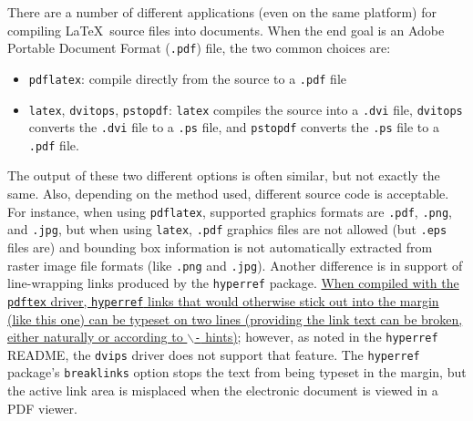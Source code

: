 There are a number of different applications (even on the same platform) for compiling \LaTeX\ source files into documents.
When the end goal is an Adobe Portable Document Format (\texttt{.pdf}) file, the two common choices are:
\begin{itemize}%
\item \texttt{pdflatex}: compile directly from the source to a \texttt{.pdf} file
\item \texttt{latex}, \texttt{dvitops}, \texttt{pstopdf}: \texttt{latex} compiles the source into a \texttt{.dvi} file, \texttt{dvi\-tops} converts the \texttt{.dvi} file to a \texttt{.ps} file, and \texttt{pstopdf} converts the \texttt{.ps} file to a \texttt{.pdf} file.
\end{itemize}%
The output of these two different options is often similar, but not exactly the same.
Also, depending on the method used, different source code is acceptable.
For instance, when using \texttt{pdflatex}, supported graphics formats are \texttt{.pdf}, \texttt{.png}, and \texttt{.jpg}, but when using \texttt{latex}, \texttt{.pdf} graphics files are not allowed (but \texttt{.eps} files are) and bounding box information is not automatically extracted from raster image file formats (like \texttt{.png} and \texttt{.jpg}).
Another difference is in support of line-wrapping links produced by the \texttt{hyperref} package.
\href{http://www.ctan.org/tex-archive/macros/latex/contrib/hyperref/README.pdf} {When compiled with the \texttt{pdftex} driver, \texttt{hyperref} links that would otherwise stick out into the margin (like this one) can be typeset on two lines (providing the link text can be broken, either naturally or according to $\backslash$\texttt{-} hints)}; however, as noted in the \texttt{hyperref} README, the \texttt{dvips} driver does not support that feature.
The \texttt{hyperref} package's \texttt{breaklinks} option stops the text from being typeset in the margin, but the active link area is misplaced when the electronic document is viewed in a PDF viewer.

